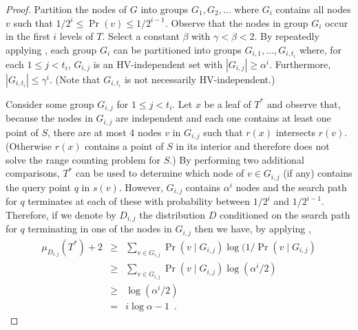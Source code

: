 \documentclass[lotsofwhite,charterfonts]{patmorin}
\begin{document}
\begin{proof}

Partition the nodes of $G$ into groups $G_1,G_2,\ldots$ where $G_i$
contains all nodes $v$ such that $1/2^{i} \le \Pr(v) \le 1/2^{i-1}$.
Observe that the nodes in group $G_i$ occur in the first $i$ levels of
$T$.  Select a constant $\beta$ with $\gamma < \beta < 2$.  By
repeatedly applying , each group $G_i$ can be
partitioned into groups $G_{i,1},\ldots,G_{i,t_i}$ where, for each $1
\le j < t_i$, $G_{i,j}$ is an HV-independent set with $|G_{i,j}|
\ge \alpha^i$.  Furthermore, $|G_{i,t_i}| \le \gamma^i$. (Note that
$G_{i,t_i}$ is not necessarily HV-independent.)

Consider some group $G_{i,j}$ for $1\le j < t_i$.  Let $x$ be a leaf
of $T^*$ and observe that, because the nodes in $G_{i,j}$ are
independent and each one contains at least one point of $S$, there are
at most 4 nodes $v$ in $G_{i,j}$ such that $r(x)$ intersects $r(v)$.
(Otherwise $r(x)$ contains a point of $S$ in its interior and
therefore does not solve the range counting problem for $S$.)
By performing two additional comparisons, $T^*$ can be used to
determine which node of $v\in G_{i,j}$ (if any) contains the query point
$q$ in $s(v)$.  
However, $G_{i,j}$ contains $\alpha^i$ nodes and the search path
for $q$ terminates at each of these with probability between $1/2^i$
and $1/2^{i-1}$.
Therefore, if we denote by $D_{i,j}$ the distribution $D$ conditioned
on the search path for $q$ terminating in one of the nodes in
$G_{i,j}$ then we have, by applying ,
\begin{eqnarray*}
   \mu_{D_{i,j}}(T^*) + 2 
    & \ge & \sum_{v\in G_{i,j}}\Pr(v\mid G_{i,j})\log(1/\Pr(v\mid G_{i,j}) \\
    & \ge & \sum_{v\in G_{i,j}}\Pr(v\mid G_{i,j})\log(\alpha^i/2) \\
    & \ge & \log(\alpha^i/2) \\
    & = & i\log\alpha - 1 \enspace .
\end{eqnarray*}


\end{proof}
\end{document}
